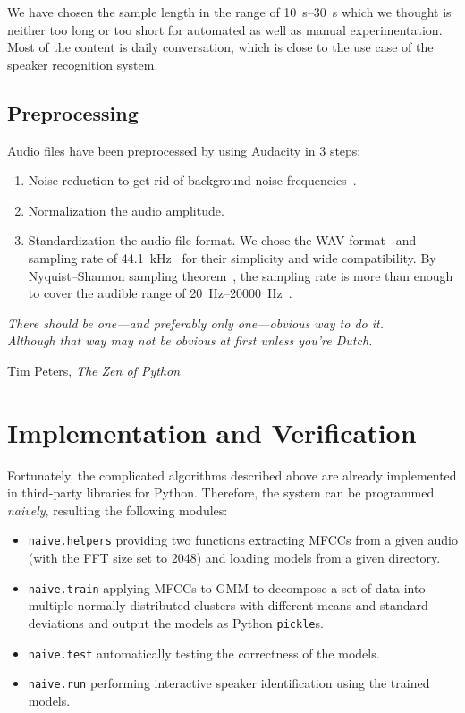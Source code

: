\documentclass[a4paper,12pt]{article}
\begin{document}
We have chosen the sample length in the range of \SIrange{10}{30}{\second}
which we thought is neither too long or too short for automated as well as
manual experimentation.  Most of the content is daily conversation, which is
close to the use case of the speaker recognition system.

\subsection{Preprocessing}
Audio files have been preprocessed by using Audacity in 3 steps:
\begin{enumerate}
  \item Noise reduction to get rid of background noise
    frequencies~\cite{noise}.
  \item Normalization the audio amplitude.
  \item  Standardization the audio file format.  We chose the WAV
    format~\cite{wave} and sampling rate of \SI{44.1}{\kilo\hertz}~\cite{khz}
    for their simplicity and wide compatibility.  By Nyquist–Shannon sampling
    theorem~\cite{shannon}, the sampling rate is more than enough to cover the
    audible range of \SIrange{20}{20000}{\hertz}~\cite{audible}.
\end{enumerate}

\newpage
\setlength{}
\epigraph{\textit{There should be one---and preferably only one---obvious way
                  to do it.\\ Although that way may not be obvious at first
                  unless you're Dutch.}}
         {Tim Peters, \textit{The Zen of Python}}
\section{Implementation and Verification}
Fortunately, the complicated algorithms described above are already implemented
in third-party libraries for Python.  Therefore, the system can be programmed
\emph{naively}, resulting the following modules:
\begin{itemize}
  \item \verb|naive.helpers| providing two functions extracting MFCCs
    from a given audio (with the FFT size set to 2048) and loading models
    from a given directory.
  \item \verb|naive.train| applying MFCCs to GMM to decompose a set of data
    into multiple normally-distributed clusters with different means and
    standard deviations and output the models as Python \verb|pickle|s.
  \item \verb|naive.test| automatically testing the correctness of the models.
  \item \verb|naive.run| performing interactive speaker identification using
    the trained models.
\end{itemize}
\end{document}
